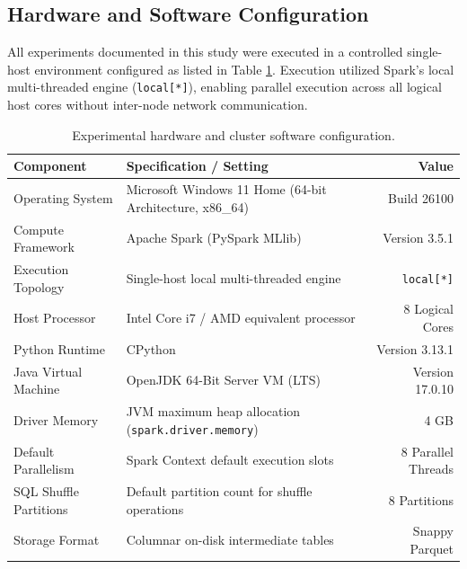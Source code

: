 \documentclass[10pt,a4paper,twoside]{article}
\begin{document}
\subsection{Hardware and Software Configuration}
All experiments documented in this study were executed in a controlled single-host environment configured as listed in Table \ref{tab:hardware_config}. Execution utilized Spark's local multi-threaded engine (\texttt{local[*]}), enabling parallel execution across all logical host cores without inter-node network communication.

\begin{table}[ht]
\centering
\small
\caption{Experimental hardware and cluster software configuration.}
\label{tab:hardware_config}
\begin{tabular}{llr}
\toprule
\textbf{Component} & \textbf{Specification / Setting} & \textbf{Value} \\
\midrule
Operating System & Microsoft Windows 11 Home (64-bit Architecture, x86\_64) & Build 26100 \\
Compute Framework & Apache Spark (PySpark MLlib) & Version 3.5.1 \\
Execution Topology & Single-host local multi-threaded engine & \texttt{local[*]} \\
Host Processor & Intel Core i7 / AMD equivalent processor & 8 Logical Cores \\
Python Runtime & CPython & Version 3.13.1 \\
Java Virtual Machine & OpenJDK 64-Bit Server VM (LTS) & Version 17.0.10 \\
Driver Memory & JVM maximum heap allocation (\texttt{spark.driver.memory}) & 4 GB \\
Default Parallelism & Spark Context default execution slots & 8 Parallel Threads \\
SQL Shuffle Partitions & Default partition count for shuffle operations & 8 Partitions \\
Storage Format & Columnar on-disk intermediate tables & Snappy Parquet \\
\bottomrule
\end{tabular}
\end{table}
\end{document}
